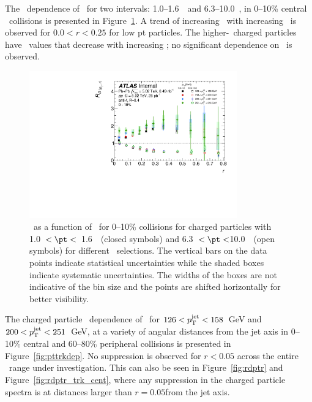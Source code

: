 The \ptjet\ dependence of \RDptr\ for two \pt intervals: 1.0--1.6~\GeV\ and \mbox{6.3--10.0~\GeV}, in 0--10\% central \pbpb\ collisions is presented in Figure~\ref{fig:ptjetdep}. A trend of increasing \RDptr\ with increasing \ptjet\ is observed for $0.0 < r < 0.25$ for low pt particles. The higher-\pt\ charged particles have \RDptr\ values that decrease with increasing \rvar; no significant dependence on \ptjet\ is observed. 

\begin{figure}[ht]
\centerline{
\includegraphics[width=0.8\textwidth]{figures/results/RDpT_dR_trk2_trk6_cent0.pdf} 
}
\caption{\RDptr\ as a function of \rvar\ for 0--10\% collisions for charged particles with 1.0~$< \pt <$~1.6~\GeV\
(closed symbols) and 6.3~$< \pt <$10.0~\GeV\ (open symbols) for different \ptjet\ selections. The vertical bars on the data points indicate statistical uncertainties while the shaded boxes indicate systematic uncertainties. The widths of the boxes are not indicative of the bin size and the points are shifted horizontally for better visibility.}
\label{fig:ptjetdep}
\end{figure}


The charged particle \pt\ dependence of \RDptr\ for \mbox{$126 < \mbox{$p_{\mathrm{T}}^{\mathrm{jet}}$} < 158$ GeV} and \mbox{$200 < \mbox{$p_{\mathrm{T}}^{\mathrm{jet}}$} < 251$ GeV}, at a variety of angular distances from the jet axis in 0--10\% central and 60--80\% peripheral collisions is presented in Figure~\ref{fig:pttrkdep}. No suppression is observed for $r < 0.05$ across the entire \pt\ range under investigation. This can also be seen in Figure~\ref{fig:rdptr} and Figure~\ref{fig:rdptr_trk_cent}, where any suppression in the charged particle spectra is at distances larger than $r = 0.05 $from the jet axis. 

